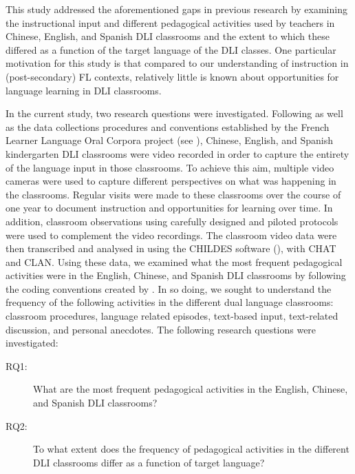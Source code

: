 \documentclass[output=paper,chinesefont]{langscibook}
\begin{document}
This study addressed the aforementioned gaps in previous research by examining the instructional input and different pedagogical activities used by teachers in Chinese, English, and Spanish DLI classrooms and the extent to which these  differed as a function of the target language of the DLI classes. One particular motivation for this study is that compared to our understanding of instruction in (post-secondary) FL contexts, relatively little is known about opportunities for language learning in DLI classrooms. 

\begin{sloppypar}
In the current study, two research questions were investigated. Following \citet{MitchellMyles2019} as well as the data collections procedures and conventions established by the French Learner Language Oral Corpora project (see \citealt{MylesMitchell2021}), Chinese, English, and Spanish kindergarten DLI classrooms were video recorded in order to capture the entirety of the language input in those classrooms. To achieve this aim, multiple video cameras were used to capture different perspectives on what was happening in the classrooms. Regular visits were made to these classrooms over the course of one year to document instruction and opportunities for learning over time. In addition, classroom observations using carefully designed and piloted protocols were used to complement the video recordings. The classroom video data were then transcribed and analysed in using the CHILDES software (\citealt{MacWhinney2000}), with CHAT and CLAN. Using these data, we examined what the most frequent pedagogical activities were in the English, Chinese, and Spanish DLI classrooms by following the coding conventions created by \citet{CollinsEtAl2012}. In so doing, we sought to understand the frequency of the following activities in the different dual language classrooms: classroom procedures, language related episodes, text-based input, text-related discussion, and personal anecdotes. The following research questions were investigated:
\end{sloppypar}

\begin{description}
  \item[RQ1:]What are the most frequent pedagogical activities in the English, Chinese, and Spanish DLI classrooms?
  \item[RQ2:]  To what extent does the frequency of pedagogical activities in the different DLI classrooms differ as a function of target language?
\end{description}
\end{document}
